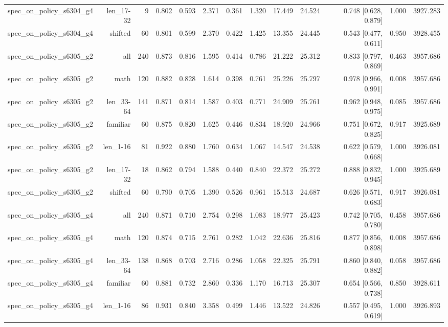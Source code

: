 \begin{tabular}{lrrrrrrrrrrrr}
spec\_on\_policy\_s6304\_g4 & len\_17-32 & 9 & 0.802 & 0.593 & 2.371 & 0.361 & 1.320 & 17.449 & 24.524 & 0.748 [0.628, 0.879] & 1.000 & 3927.283 \\
spec\_on\_policy\_s6304\_g4 & shifted & 60 & 0.801 & 0.599 & 2.370 & 0.422 & 1.425 & 13.355 & 24.445 & 0.543 [0.477, 0.611] & 0.950 & 3928.455 \\
spec\_on\_policy\_s6305\_g2 & all & 240 & 0.873 & 0.816 & 1.595 & 0.414 & 0.786 & 21.222 & 25.312 & 0.833 [0.797, 0.869] & 0.463 & 3957.686 \\
spec\_on\_policy\_s6305\_g2 & math & 120 & 0.882 & 0.828 & 1.614 & 0.398 & 0.761 & 25.226 & 25.797 & 0.978 [0.966, 0.991] & 0.008 & 3957.686 \\
spec\_on\_policy\_s6305\_g2 & len\_33-64 & 141 & 0.871 & 0.814 & 1.587 & 0.403 & 0.771 & 24.909 & 25.761 & 0.962 [0.948, 0.975] & 0.085 & 3957.686 \\
spec\_on\_policy\_s6305\_g2 & familiar & 60 & 0.875 & 0.820 & 1.625 & 0.446 & 0.834 & 18.920 & 24.966 & 0.751 [0.672, 0.825] & 0.917 & 3925.689 \\
spec\_on\_policy\_s6305\_g2 & len\_1-16 & 81 & 0.922 & 0.880 & 1.760 & 0.634 & 1.067 & 14.547 & 24.538 & 0.622 [0.579, 0.668] & 1.000 & 3926.081 \\
spec\_on\_policy\_s6305\_g2 & len\_17-32 & 18 & 0.862 & 0.794 & 1.588 & 0.440 & 0.840 & 22.372 & 25.272 & 0.888 [0.832, 0.945] & 1.000 & 3925.689 \\
spec\_on\_policy\_s6305\_g2 & shifted & 60 & 0.790 & 0.705 & 1.390 & 0.526 & 0.961 & 15.513 & 24.687 & 0.626 [0.571, 0.683] & 0.917 & 3926.081 \\
spec\_on\_policy\_s6305\_g4 & all & 240 & 0.871 & 0.710 & 2.754 & 0.298 & 1.083 & 18.977 & 25.423 & 0.742 [0.705, 0.780] & 0.458 & 3957.686 \\
spec\_on\_policy\_s6305\_g4 & math & 120 & 0.874 & 0.715 & 2.761 & 0.282 & 1.042 & 22.636 & 25.816 & 0.877 [0.856, 0.898] & 0.008 & 3957.686 \\
spec\_on\_policy\_s6305\_g4 & len\_33-64 & 138 & 0.868 & 0.703 & 2.716 & 0.286 & 1.058 & 22.325 & 25.791 & 0.860 [0.840, 0.882] & 0.058 & 3957.686 \\
spec\_on\_policy\_s6305\_g4 & familiar & 60 & 0.881 & 0.732 & 2.860 & 0.336 & 1.170 & 16.713 & 25.307 & 0.654 [0.566, 0.738] & 0.850 & 3928.611 \\
spec\_on\_policy\_s6305\_g4 & len\_1-16 & 86 & 0.931 & 0.840 & 3.358 & 0.499 & 1.446 & 13.522 & 24.826 & 0.557 [0.495, 0.619] & 1.000 & 3926.893 \\

\end{tabular}
